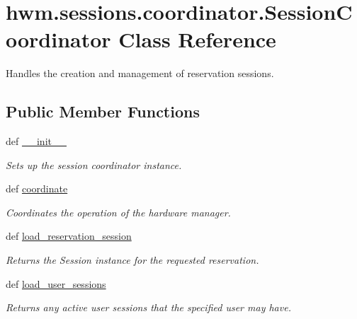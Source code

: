\hypertarget{classhwm_1_1sessions_1_1coordinator_1_1_session_coordinator}{\section{hwm.\-sessions.\-coordinator.\-Session\-Coordinator Class Reference}
\label{classhwm_1_1sessions_1_1coordinator_1_1_session_coordinator}
}


Handles the creation and management of reservation sessions.  


\subsection*{Public Member Functions}
\begin{DoxyCompactItemize}
\item 
def \hyperlink{classhwm_1_1sessions_1_1coordinator_1_1_session_coordinator_aaaf071b58d2881b65a4e75c4ae2d00e7}{\-\_\-\-\_\-init\-\_\-\-\_\-}
\begin{DoxyCompactList}\small\item\em Sets up the session coordinator instance. \end{DoxyCompactList}\item 
def \hyperlink{classhwm_1_1sessions_1_1coordinator_1_1_session_coordinator_ab62005ec016aea7fe48a4e3b903c068a}{coordinate}
\begin{DoxyCompactList}\small\item\em Coordinates the operation of the hardware manager. \end{DoxyCompactList}\item 
def \hyperlink{classhwm_1_1sessions_1_1coordinator_1_1_session_coordinator_a62107acaefa8d34f454dfbef45cfb7b4}{load\-\_\-reservation\-\_\-session}
\begin{DoxyCompactList}\small\item\em Returns the Session instance for the requested reservation. \end{DoxyCompactList}\item 
def \hyperlink{classhwm_1_1sessions_1_1coordinator_1_1_session_coordinator_acd2f3437a219f91b86081d53e56bea19}{load\-\_\-user\-\_\-sessions}
\begin{DoxyCompactList}\small\item\em Returns any active user sessions that the specified user may have. \end{DoxyCompactList}\end{DoxyCompactItemize}
